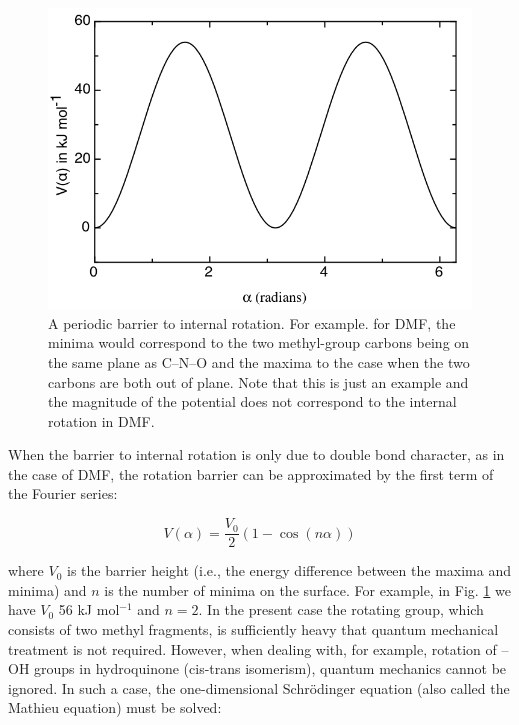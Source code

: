 \documentclass[byrevtex,amssymb,aps,pra,floatfix,letterpaper]{revtex4}
\begin{document}
\begin{figure}[!htp]
\begin{center}
\includegraphics[scale=0.35]{fig7}
\caption{A periodic barrier to internal rotation. For example. for DMF, the minima would correspond to the two methyl-group carbons being on the same plane as C--N--O and the maxima to the case when the two carbons are both out of plane. Note that this is just an example and the magnitude of the potential does not correspond to the internal rotation in DMF.}
\label{fig7}
\end{center}
\end{figure}

When the barrier to internal rotation is only due to double bond character, as in the case of DMF, the rotation barrier can be approximated by the first term of the Fourier series:

\begin{equation}
V(\alpha) = \frac{V_0}{2}\left(1 - \cos(n\alpha)\right)
\label{eq7}
\end{equation}

\noindent
where $V_0$ is the barrier height (i.e., the energy difference between the maxima and minima) and $n$ is the number of minima on the surface. For example, in Fig. \ref{fig7} we have $V_0$ 56 kJ mol$^{-1}$ and $n = 2$. In the present case the rotating group, which consists of two methyl fragments, is sufficiently heavy that quantum mechanical treatment is not required. However, when dealing with, for example, rotation of --OH groups in hydroquinone (cis-trans isomerism), quantum mechanics cannot be ignored. In such a case, the one-dimensional Schr\"odinger equation (also called the Mathieu equation) must be solved:
\end{document}
